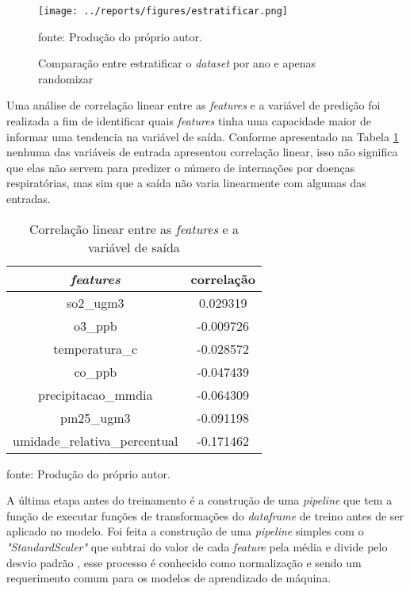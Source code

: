\documentclass[
  12pt,		%
  a4paper,	%
  openright,%
  oneside,	%
  chapter=TITLE,		%
  section=TITLE,		%
  english,	%
  french,	%
  spanish,	%
  brazil	%
]{abntex2}
\begin{document}
    \begin{figure}[ht]
        \centering
        \caption{Comparação entre estratificar o \textit{dataset} por ano e apenas randomizar}
        \texttt{[image: ../reports/figures/estratificar.png]}
        \label{estratificado}
        \par
        {\small fonte: Produção do próprio autor.}
    \end{figure}

    Uma análise de correlação linear entre as \textit{features} e a variável de predição foi realizada a fim de identificar
    quais \textit{features} tinha uma capacidade maior de informar uma tendencia na variável de saída. Conforme apresentado na Tabela
    \ref*{corr_table} nenhuma das variáveis de entrada apresentou correlação linear, isso não significa que elas não servem para 
    predizer o número de internações por doenças respiratórias, mas sim que a saída não varia linearmente com algumas
    das entradas.

    \begin{table}[ht]
        \centering
        \caption{Correlação linear entre as \textit{features} e a variável de saída}
        \label{corr_table}
        \begin{tabular}{cc}
            \hline
            \multicolumn{1}{|c|}{\textit{features}} & \multicolumn{1}{c|}{correlação}\\
            \hline
            so2\_ugm3 & 0.029319\\
            o3\_ppb & -0.009726\\
            temperatura\_c & -0.028572\\
            co\_ppb & -0.047439\\
            precipitacao\_mmdia & -0.064309\\
            pm25\_ugm3 & -0.091198\\
            umidade\_relativa\_percentual & -0.171462\\
            \hline
        \end{tabular}
        \par
        {\small fonte: Produção do próprio autor.}
    \end{table}

    A última etapa antes do treinamento é a construção de uma \textit{pipeline} que tem a função de executar funções
    de transformações do \textit{dataframe} de treino antes de ser aplicado no modelo. Foi feita a construção de uma 
    \textit{pipeline} simples com o \textit{"StandardScaler"} que subtrai do valor de cada \textit{feature} pela média e divide pelo desvio padrão
    , esse processo é conhecido como normalização e sendo um requerimento comum para os modelos de aprendizado de máquina.
\end{document}
